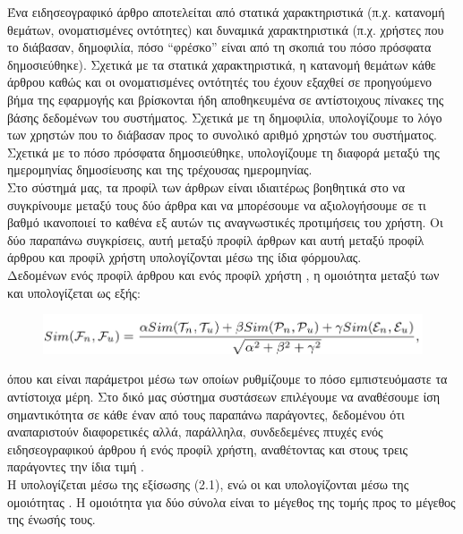 {{{{{{{{Ένα ειδησεογραφικό άρθρο αποτελείται από στατικά χαρακτηριστικά (π.χ. κατανομή θεμάτων, 
ονοματισμένες οντότητες) και δυναμικά χαρακτηριστικά (π.χ. χρήστες που το διάβασαν, δημοφιλία, 
πόσο “φρέσκο” είναι από τη σκοπιά του πόσο πρόσφατα δημοσιεύθηκε). 
Σχετικά με τα στατικά χαρακτηριστικά, η κατανομή θεμάτων κάθε άρθρου καθώς και οι ονοματισμένες οντότητές του 
έχουν εξαχθεί σε προηγούμενο βήμα της εφαρμογής και βρίσκονται ήδη αποθηκευμένα σε αντίστοιχους πίνακες της βάσης δεδομένων του συστήματος. 
Σχετικά με τη δημοφιλία, υπολογίζουμε το λόγο των χρηστών που το διάβασαν 
προς το συνολικό αριθμό χρηστών του συστήματος. 
Σχετικά με το πόσο πρόσφατα δημοσιεύθηκε, υπολογίζουμε τη διαφορά μεταξύ της ημερομηνίας δημοσίευσης 
και της τρέχουσας ημερομηνίας. \\

Στο σύστημά μας, τα προφίλ των άρθρων είναι ιδιαιτέρως βοηθητικά στο να συγκρίνουμε μεταξύ τους 
δύο άρθρα και να μπορέσουμε να αξιολογήσουμε σε τι βαθμό ικανοποιεί το καθένα εξ αυτών 
τις αναγνωστικές προτιμήσεις του χρήστη. 
Οι δύο παραπάνω συγκρίσεις, αυτή μεταξύ προφίλ άρθρων και αυτή μεταξύ προφίλ άρθρου και προφίλ χρήστη 
υπολογίζονται μέσω της ίδια φόρμουλας. \\

Δεδομένων ενός προφίλ άρθρου {}
και ενός προφίλ χρήστη {}, 
η ομοιότητα μεταξύ των {} και {} υπολογίζεται ως εξής: 

\begin{figure}[!ht] \centering
    \includegraphics[scale=0.4]{static/figures/sim.png}
    \label{}
\end{figure} 

όπου {} και {} είναι παράμετροι μέσω των οποίων 
ρυθμίζουμε το πόσο εμπιστευόμαστε τα αντίστοιχα μέρη. 
Στο δικό μας σύστημα συστάσεων επιλέγουμε να αναθέσουμε ίση σημαντικότητα 
σε κάθε έναν από τους παραπάνω παράγοντες, δεδομένου ότι αναπαριστούν διαφορετικές 
αλλά, παράλληλα, συνδεδεμένες πτυχές ενός ειδησεογραφικού άρθρου ή ενός προφίλ χρήστη, 
αναθέτοντας και στους τρεις παράγοντες την ίδια τιμή {}. \\

Η {} υπολογίζεται μέσω της εξίσωσης (2.1), 
ενώ οι {} και 
{} 
υπολογίζονται μέσω της ομοιότητας {}. 
Η ομοιότητα {} \cite{Jac02} για δύο σύνολα είναι το μέγεθος της τομής προς το μέγεθος της ένωσής τους. \\

}}}}}}}}
